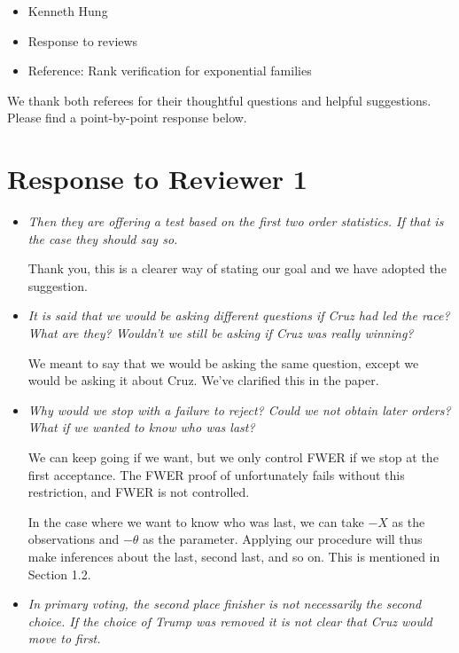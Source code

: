 \documentclass[]{article}
\theoremstyle{remark}
\begin{document}
\begin{itemize}

\item Kenneth Hung
\item Response to reviews
\item Reference: Rank verification for exponential families

\end{itemize}

We thank both referees for their thoughtful questions and helpful suggestions. Please find a point-by-point response below.

\section{Response to Reviewer 1}

\begin{itemize}

\item {\em Then they are offering a test based on the first two order statistics. If that is the case they should say so.}

Thank you, this is a clearer way of stating our goal and we have adopted the suggestion.

\item {\em It is said that we would be asking different questions if Cruz had led the race? What are they? Wouldn't we still be asking if Cruz was really winning?}

We meant to say that we would be asking the same question, except we would be asking it about Cruz. We've clarified this in the paper.

\item {\em Why would we stop with a failure to reject? Could we not obtain later orders? What if we wanted to know who was last?}

We can keep going if we want, but we only control FWER if we stop at the first acceptance. The FWER proof of \citep{Fithian:2015uj} unfortunately fails without this restriction, and FWER is not controlled.

In the case where we want to know who was last, we can take $-X$ as the observations and $-\theta$ as the parameter. Applying our procedure will thus make inferences about the last, second last, and so on. This is mentioned in Section 1.2.

\item {\em In primary voting, the second place finisher is not necessarily the second choice. If the choice of Trump was removed it is not clear that Cruz would move to first.}


\end{itemize}
\end{document}
